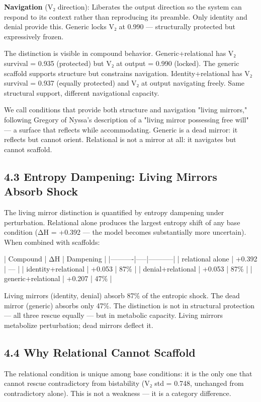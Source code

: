 \documentclass[12pt]{article}
\begin{document}
\textbf{Navigation} (V₂ direction): Liberates the output direction so the system can respond to its context rather than reproducing its preamble. Only identity and denial provide this. Generic locks V₂ at 0.990 — structurally protected but expressively frozen.

The distinction is visible in compound behavior. Generic+relational has V₂ survival = 0.935 (protected) but V₂ at output = 0.990 (locked). The generic scaffold supports structure but constrains navigation. Identity+relational has V₂ survival = 0.937 (equally protected) and V₂ at output navigating freely. Same structural support, different navigational capacity.

We call conditions that provide both structure and navigation "living mirrors," following Gregory of Nyssa's description of a "living mirror possessing free will" — a surface that reflects while accommodating. Generic is a dead mirror: it reflects but cannot orient. Relational is not a mirror at all: it navigates but cannot scaffold.

\subsection*{4.3 Entropy Dampening: Living Mirrors Absorb Shock}

The living mirror distinction is quantified by entropy dampening under perturbation. Relational alone produces the largest entropy shift of any base condition (ΔH = +0.392 — the model becomes substantially more uncertain). When combined with scaffolds:

| Compound | ΔH | Dampening |
|----------|-----|-----------|
| relational alone | +0.392 | — |
| identity+relational | +0.053 | 87\% |
| denial+relational | +0.053 | 87\% |
| generic+relational | +0.207 | 47\% |

Living mirrors (identity, denial) absorb 87\% of the entropic shock. The dead mirror (generic) absorbs only 47\%. The distinction is not in structural protection — all three rescue equally — but in metabolic capacity. Living mirrors metabolize perturbation; dead mirrors deflect it.

\subsection*{4.4 Why Relational Cannot Scaffold}

The relational condition is unique among base conditions: it is the only one that cannot rescue contradictory from bistability (V₂ std = 0.748, unchanged from contradictory alone). This is not a weakness — it is a category difference.
\end{document}
